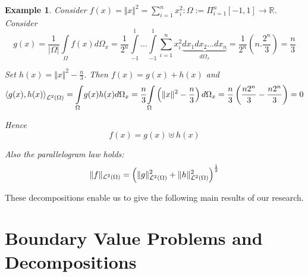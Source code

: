 \documentclass{amsart}%
\providecommand{\U}[1]{\protect\rule{.1in}{.1in}}
\theoremstyle{plain}
\newtheorem{example}{Example}
\numberwithin{equation}{section}
\begin{document}
\begin{example}
Consider $f(x)=\Vert x\Vert^{2}=%
{\displaystyle\sum\limits_{i=1}^{n}}
x_{i}^{2}:\Omega:=\Pi_{i=1}^{n}\left[  -1,1\right]  \longrightarrow%
\mathbb{R}
$. Consider
\[
g\left(  x\right)  =\frac{1}{|\Omega|}%
{\displaystyle\int\limits_{\Omega}}
f(x)d\Omega_{x}=\frac{1}{2^{n}}%
{\displaystyle\int\limits_{-1}^{1}}
...%
{\displaystyle\int\limits_{-1}^{1}}
{\displaystyle\sum\limits_{i=1}^{n}}
x_{i}^{2}\underset{d\Omega_{x}}{\underbrace{dx_{1}dx_{2}...dx_{n}}}=\frac
{1}{2^{n}}\left(  n.\frac{2^{n}}{3}\right)  =\frac{n}{3}%
\]


Set $h\left(  x\right)  =\Vert x\Vert^{2}-\frac{n}{3}$. Then $f(x)=g(x)+h(x)$
and
\[
\left\langle g(x),h(x)\right\rangle _{%
\mathcal{L}%
^{2}\left(  \Omega\right)  }=%
{\displaystyle\int\limits_{\Omega}}
g(x)h(x)d\Omega_{x}=\frac{n}{3}%
{\displaystyle\int\limits_{\Omega}}
\left(  \Vert x\Vert^{2}-\frac{n}{3}\right)  d\Omega_{x}=\frac{n}{3}\left(
\frac{n2^{n}}{3}-\frac{n2^{n}}{3}\right)  =0
\]


Hence
\[
f(x)=g(x)\uplus h(x)
\]


Also the parallelogram law holds:%
\[
\Vert f\Vert_{%
\mathcal{L}%
^{2}\left(  \Omega\right)  }=\left(  \Vert g\Vert_{%
\mathcal{L}%
^{2}\left(  \Omega\right)  }^{2}+\Vert h\Vert_{%
\mathcal{L}%
^{2}\left(  \Omega\right)  }^{2}\right)  ^{\frac{1}{2}}%
\]

\end{example}

These decompositions enable us to give the following main results of our research.

\section{Boundary Value Problems and Decompositions}
\end{document}
